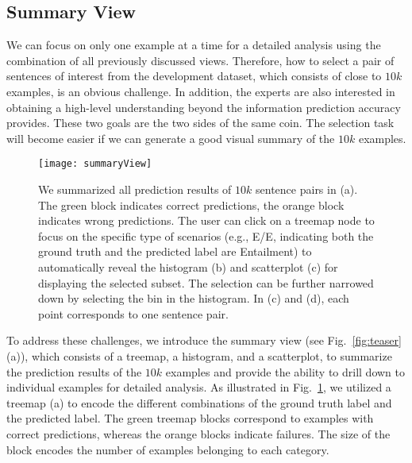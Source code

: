 

\subsection{Summary View}
\label{sec:allPairs}
We can focus on only one example at a time for a detailed analysis using the combination of all previously discussed views. Therefore, how to select a pair of sentences of interest from the development dataset, which consists of close to $10k$ examples, is an obvious challenge.
In addition, the experts are also interested in obtaining a high-level understanding beyond the information prediction accuracy provides.%
%
These two goals are the two sides of the same coin. 
The selection task will become easier if we can generate a good visual summary of the $10k$ examples.%

\begin{figure}[htbp]
\centering
\vspace{-3mm}
 \texttt{[image: summaryView]}
 \vspace{-3mm}
 \caption{
We summarized all prediction results of $10k$ sentence pairs in (a). The green block indicates correct predictions, the orange block indicates wrong predictions. %
%
The user can click on a treemap node to focus on the specific type of scenarios (e.g., E/E, indicating both the ground truth and the predicted label are Entailment) to automatically reveal the histogram (b) and scatterplot (c) for displaying the selected subset.
%
The selection can be further narrowed down by selecting the bin in the histogram.
In (c) and (d), each point corresponds to one sentence pair.
 }
 \vspace{-3mm}
\label{fig:summaryView}
\end{figure}

To address these challenges, we introduce the summary view (see Fig.~\ref{fig:teaser}(a)), which consists of a treemap, a histogram, and a scatterplot, to summarize the prediction results of the $10k$ examples and provide the ability to drill down to individual examples for detailed analysis.
As illustrated in Fig.~\ref{fig:summaryView}, we utilized a treemap (a) to encode the different combinations of the ground truth label and the predicted label. The green treemap blocks correspond to examples with correct predictions, whereas the orange blocks indicate failures. The size of the block encodes the number of examples belonging to each category.

